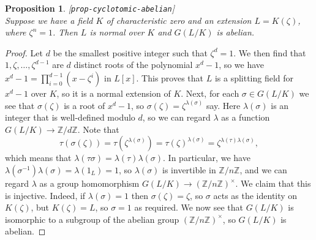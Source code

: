 \documentclass{amsart}
\newcommand{\lbl}[1]{\label{#1}\textup{[\texttt{#1}]}\ \\}
\newcommand{\lbl}{\label}
\newcommand{\Z}         {{\mathbb{Z}}}
\newcommand{\zt}        {\zeta}
\newcommand{\lm}        {\lambda}
\newcommand{\sg}        {\sigma}
\newcommand{\tm}        {\times}
\renewcommand{\:}{\colon}
\newtheorem{proposition}[theorem]{Proposition}
\theoremstyle{definition}
\begin{document}
\begin{proposition}\lbl{prop-cyclotomic-abelian}
 Suppose we have a field $K$ of characteristic zero and an extension
 $L=K(\zt)$, where $\zt^n=1$.  Then $L$ is normal over $K$ and
 $G(L/K)$ is abelian.
\end{proposition}
\begin{proof}
 Let $d$ be the smallest positive integer such that $\zt^d=1$.  We
 then find that $1,\zt,\dots,\zt^{d-1}$ are $d$ distinct roots of the
 polynomial $x^d-1$, so we have $x^d-1=\prod_{i=0}^{d-1}(x-\zt^i)$ in
 $L[x]$.  This proves that $L$ is a splitting field for $x^d-1$ over
 $K$, so it is a normal extension of $K$.  Next, for each
 $\sg\in G(L/K)$ we see that $\sg(\zt)$ is a root of $x^d-1$, so
 $\sg(\zt)=\zt^{\lm(\sg)}$ say.  Here $\lm(\sg)$ is an integer that is
 well-defined modulo $d$, so we can regard $\lm$ as a function
 $G(L/K)\to\Z/d\Z$.  Note that
 \[ \tau(\sg(\zt)) = \tau(\zt^{\lm(\sg)}) = 
     \tau(\zt)^{\lm(\sg)}=\zt^{\lm(\tau)\lm(\sg)},
 \]
 which means that $\lm(\tau\sg)=\lm(\tau)\lm(\sg)$.  In particular, we
 have $\lm(\sg^{-1})\lm(\sg)=\lm(1_L)=1$, so $\lm(\sg)$ is invertible
 in $\Z/n\Z$, and we can regard $\lm$ as a group homomorphism
 $G(L/K)\to(\Z/n\Z)^\tm$.  We claim that this is injective.  Indeed,
 if $\lm(\sg)=1$ then $\sg(\zt)=\zt$, so $\sg$ acts as the identity on
 $K(\zt)$, but $K(\zt)=L$, so $\sg=1$ as required.  We now see that
 $G(L/K)$ is isomorphic to a subgroup of the abelian group
 $(\Z/n\Z)^\tm$, so $G(L/K)$ is abelian.
\end{proof}
\end{document}
